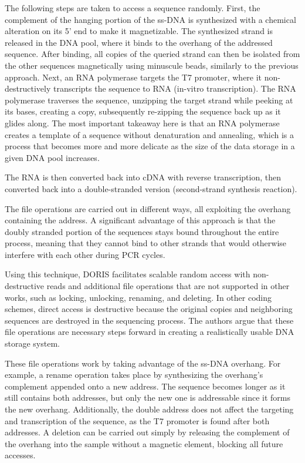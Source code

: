 \documentclass[a4paper,conference]{IEEEtran}
\begin{document}
The following steps are taken to access a sequence randomly. First, the complement of the hanging portion of the ss-DNA is synthesized with a chemical alteration on its 5' end to make it magnetizable. The synthesized strand is released in the DNA pool, where it binds to the overhang of the addressed sequence. After binding, all copies of the queried strand can then be isolated from the other sequences magnetically using minuscule beads, similarly to the previous approach. Next, an RNA polymerase targets the T7 promoter, where it non-destructively transcripts the sequence to RNA (in-vitro transcription). The RNA polymerase traverses the sequence, unzipping the target strand while peeking at its bases, creating a copy, subsequently re-zipping the sequence back up as it glides along. The most important takeaway here is that an RNA polymerase creates a template of a sequence without denaturation and annealing, which is a process that becomes more and more delicate as the size of the data storage in a given DNA pool increases.

The RNA is then converted back into cDNA with reverse transcription, then converted back into a double-stranded version (second-strand synthesis reaction).

The file operations are carried out in different ways, all exploiting the overhang containing the address. A significant advantage of this approach is that the doubly stranded portion of the sequences stays bound throughout the entire process, meaning that they cannot bind to other strands that would otherwise interfere with each other during PCR cycles.

Using this technique, DORIS facilitates scalable random access with non-destructive reads and additional file operations that are not supported in other works, such as locking, unlocking, renaming, and deleting. In other coding schemes, direct access is destructive because the original copies and neighboring sequences are destroyed in the sequencing process. The authors argue that these file operations are necessary steps forward in creating a realistically usable DNA storage system.

These file operations work by taking advantage of the ss-DNA overhang. For example, a rename operation takes place by synthesizing the overhang's complement appended onto a new address. The sequence becomes longer as it still contains both addresses, but only the new one is addressable since it forms the new overhang. Additionally, the double address does not affect the targeting and transcription of the sequence, as the T7 promoter is found after both addresses. A deletion can be carried out simply by releasing the complement of the overhang into the sample without a magnetic element, blocking all future accesses.
\end{document}
